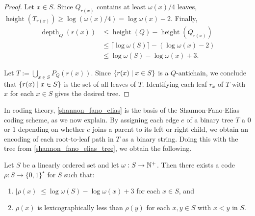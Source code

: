 \documentclass{patmorin}
\renewcommand{\le}{\leqslant}
\renewcommand{\geq}{\geqslant}
\DeclareMathOperator{\height}{height}
\DeclareMathOperator{\depth}{depth}
\DeclarePairedDelimiter{\set}{\{}{\}}
\begin{document}
\begin{proof}
    Let $x\in S$. Since $Q_{r(x)}$ contains at least $\omega(x)/4$ leaves, $\height(T_{r(x)}) \geq \log(\omega(x)/4) = \log\omega(x) - 2$. Finally,
     \begin{align*}
     \depth_Q(r(x))
     &\le \height(Q)-\height(Q_{r(x)})\\
     &\le \lceil\log\omega(S)\rceil - (\log\omega(x) - 2)\\
     &\le \log\omega(S) - \log\omega(x) +3.
     \end{align*}

    Let $T:=\bigcup_{x\in S} P_Q(r(x))$.
    Since $\set{r(x) \mid x\in S}$ is a $Q$-antichain,
    we conclude that $\set{r(x)\mid x\in S}$ is the set of all leaves of $T$.
    Identifying each leaf $r_x$ of $T$ with $x$ for each $x\in S$ gives the desired tree.
   \end{proof}




  In coding theory, \cref{shannon_fano_elias} is the basis of the Shannon-Fano-Elias coding scheme, as we now explain.  By assigning each edge $e$ of a binary tree $T$ a $0$ or $1$ depending on whether $e$ joins a parent to its left or right child, we obtain an encoding of each root-to-leaf path in $T$ as a binary string. Doing this with the tree from \cref{shannon_fano_elias_tree}, we obtain the following.

  \begin{cor}\label{shannon_fano_elias_code}\label{shannon_fano_elias_cor}
    Let $S$ be a linearly ordered set and let $\omega:S\to\mathbb{N}^+$.  Then there exists a code $\rho:S\to \{0,1\}^\star$ for $S$ such that:
    \begin{enumerate}[nosep,nolistsep,label=(\alph*)]
      \item $|\rho(x)|\le \log\omega(S) - \log\omega(x)+3$ for each $x\in S$, and
      \item $\rho(x)$ is lexicographically less than $\rho(y)$ for each $x,y\in S$ with $x< y$ in $S$.
    \end{enumerate}
  \end{cor}
\end{document}
